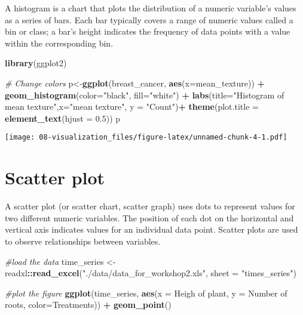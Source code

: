 \documentclass[
]{book}
\newenvironment{Shaded}{\begin{snugshade}}{\end{snugshade}}
\newcommand{\AttributeTok}[1]{\textcolor[rgb]{0.13,0.29,0.53}{#1}}
\newcommand{\CommentTok}[1]{\textcolor[rgb]{0.56,0.35,0.01}{\textit{#1}}}
\newcommand{\FloatTok}[1]{\textcolor[rgb]{0.00,0.00,0.81}{#1}}
\newcommand{\FunctionTok}[1]{\textcolor[rgb]{0.13,0.29,0.53}{\textbf{#1}}}
\newcommand{\NormalTok}[1]{#1}
\newcommand{\OtherTok}[1]{\textcolor[rgb]{0.56,0.35,0.01}{#1}}
\newcommand{\SpecialCharTok}[1]{\textcolor[rgb]{0.81,0.36,0.00}{\textbf{#1}}}
\newcommand{\StringTok}[1]{\textcolor[rgb]{0.31,0.60,0.02}{#1}}
\begin{document}
A histogram is a chart that plots the distribution of a numeric variable's values as a series of bars. Each bar typically covers a range of numeric values called a bin or class; a bar's height indicates the frequency of data points with a value within the corresponding bin.

\begin{Shaded}
\begin{Highlighting}[]
\FunctionTok{library}\NormalTok{(ggplot2)}

\CommentTok{\# Change colors}
\NormalTok{p}\OtherTok{\textless{}{-}}\FunctionTok{ggplot}\NormalTok{(breast\_cancer, }\FunctionTok{aes}\NormalTok{(}\AttributeTok{x=}\NormalTok{mean\_texture)) }\SpecialCharTok{+} 
  \FunctionTok{geom\_histogram}\NormalTok{(}\AttributeTok{color=}\StringTok{"black"}\NormalTok{, }\AttributeTok{fill=}\StringTok{"white"}\NormalTok{) }\SpecialCharTok{+}
  \FunctionTok{labs}\NormalTok{(}\AttributeTok{title=}\StringTok{"Histogram of mean texture"}\NormalTok{,}\AttributeTok{x=}\StringTok{"mean texture"}\NormalTok{,}
       \AttributeTok{y =} \StringTok{"Count"}\NormalTok{)}\SpecialCharTok{+}
  \FunctionTok{theme}\NormalTok{(}\AttributeTok{plot.title =} \FunctionTok{element\_text}\NormalTok{(}\AttributeTok{hjust =} \FloatTok{0.5}\NormalTok{))}
\NormalTok{p}
\end{Highlighting}
\end{Shaded}

\texttt{[image: 08-visualization\_files/figure-latex/unnamed-chunk-4-1.pdf]}

\hypertarget{scatter-plot}{%
\section{\texorpdfstring{Scatter plot\\
}{Scatter plot }}\label{scatter-plot}}

A scatter plot (or scatter chart, scatter graph) uses dots to represent values for two different numeric variables. The position of each dot on the horizontal and vertical axis indicates values for an individual data point. Scatter plots are used to observe relationships between variables.

\begin{Shaded}
\begin{Highlighting}[]
\CommentTok{\#load the data}
\NormalTok{time\_series }\OtherTok{\textless{}{-}}\NormalTok{ readxl}\SpecialCharTok{::}\FunctionTok{read\_excel}\NormalTok{(}\StringTok{"./data/data\_for\_workshop2.xls"}\NormalTok{, }\AttributeTok{sheet =} \StringTok{"times\_series"}\NormalTok{)}

\CommentTok{\#plot the figure}
\FunctionTok{ggplot}\NormalTok{(time\_series, }\FunctionTok{aes}\NormalTok{(}\AttributeTok{x =} \StringTok{\textasciigrave{}}\AttributeTok{Heigh of plant}\StringTok{\textasciigrave{}}\NormalTok{,}
                   \AttributeTok{y =} \StringTok{\textasciigrave{}}\AttributeTok{Number of roots}\StringTok{\textasciigrave{}}\NormalTok{, }\AttributeTok{color=}\NormalTok{Treatments)) }\SpecialCharTok{+}
  \FunctionTok{geom\_point}\NormalTok{()}
\end{Highlighting}
\end{Shaded}
\end{document}

